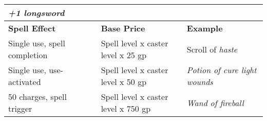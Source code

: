 \begin{longtable}{llllll}
{\begin{minipage}[t]{1.628in}
\textit{+1 longsword}\end{minipage}}\\
\hline
\multicolumn{4}{p{1.366in}|}{\begin{minipage}[t]{1.366in}\raggedright
\textbf{Spell Effect }\end{minipage}} & \multicolumn{1}{|p{1.506in}|}{\begin{minipage}[t]{1.506in}\raggedright
\textbf{Base Price }\end{minipage}} & \multicolumn{1}{p{1.628in}|}{\begin{minipage}[t]{1.628in}\raggedright
\textbf{Example}\end{minipage}}\\
\hline
\multicolumn{4}{p{1.366in}|}{\begin{minipage}[t]{1.366in}\raggedright
Single use, spell completion \end{minipage}} & \multicolumn{1}{|p{1.506in}|}{\begin{minipage}[t]{1.506in}\raggedright
Spell level  x caster level  x 25 gp \end{minipage}} & \multicolumn{1}{p{1.628in}|}{\begin{minipage}[t]{1.628in}\raggedright
Scroll of \textit{haste}\end{minipage}}\\
\hline
\multicolumn{4}{p{1.366in}|}{\begin{minipage}[t]{1.366in}\raggedright
Single use, use-activated \end{minipage}} & \multicolumn{1}{|p{1.506in}|}{\begin{minipage}[t]{1.506in}\raggedright
Spell level  x caster level  x 50 gp \end{minipage}} & \multicolumn{1}{p{1.628in}|}{\begin{minipage}[t]{1.628in}\raggedright
\textit{Potion of cure light wounds}\end{minipage}}\\
\hline
\multicolumn{4}{p{1.366in}|}{\begin{minipage}[t]{1.366in}\raggedright
50 charges, spell trigger \end{minipage}} & \multicolumn{1}{|p{1.506in}|}{\begin{minipage}[t]{1.506in}\raggedright
Spell level  x caster level  x 750 gp \end{minipage}} & \multicolumn{1}{p{1.628in}|}{\begin{minipage}[t]{1.628in}\raggedright
\textit{Wand of fireball}\end{minipage}}\\

\end{longtable}
